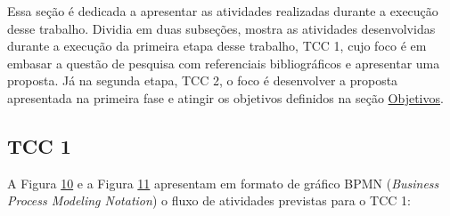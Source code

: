 Essa seção é dedicada a apresentar as atividades realizadas durante a execução desse trabalho. Dividia em duas subseções,
mostra as atividades desenvolvidas durante a execução da primeira etapa desse trabalho, TCC 1, cujo foco é em embasar a 
questão de pesquisa com referenciais bibliográficos e apresentar uma proposta. Já na segunda etapa, TCC 2, o foco é 
desenvolver a proposta apresentada na primeira fase e atingir os objetivos definidos na seção 
\hyperref[sec:objetivos]{Objetivos}.

\subsection{TCC 1}\label{subsec:tcc1}

A Figura \hyperref[fig:bpmnTcc1]{10} e a Figura \hyperref[fig:subproccesstcc1]{11} apresentam em formato de gráfico BPMN (\textit{Business Process Modeling Notation}) 
o fluxo de atividades previstas para o TCC 1:

